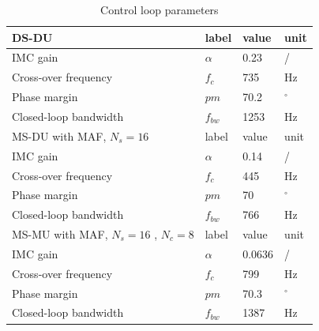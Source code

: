 \documentclass[conference]{IEEEtran}
\begin{document}
\begin{table}[h!]
			  \caption{Control loop parameters}
              \label{tab:an_param}
              \centering
              \begin{tabular}{llll}
                           \midrule\midrule
        DS-DU & label & value   & unit\\
        \midrule               
                  IMC gain	& $\alpha$ & 0.23 & /\\  
                  Cross-over frequency  & $f_{c}$ & 735 & Hz   \\
                  Phase margin  & $pm$ & 70.2 &  $^\circ$  \\
                  Closed-loop bandwidth  & $f_{bw}$ & 1253 & Hz   \\
                  \midrule\midrule

        MS-DU with MAF, $N_s = 16$ & label & value   & unit\\
        \midrule               
                  IMC gain	& $\alpha$ & 0.14 & /\\  
                  Cross-over frequency  & $f_{c}$ & 445 & Hz   \\
                  Phase margin  & $pm$ & 70 &  $^\circ$  \\
                  Closed-loop bandwidth  & $f_{bw}$ & 766 & Hz   \\
                  \midrule\midrule
      MS-MU with MAF, $N_s = 16$ , $N_c =  8$ & label & value   & unit\\
        \midrule               
                  IMC gain	& $\alpha$ & 0.0636 & /\\  
                  Cross-over frequency  & $f_{c}$ & 799 & Hz   \\
                  Phase margin  & $pm$ & 70.3 &  $^\circ$  \\
                  Closed-loop bandwidth  & $f_{bw}$ & 1387 & Hz   \\
                  \midrule\midrule
                                                        
              \end{tabular}
\end{table}
\end{document}
